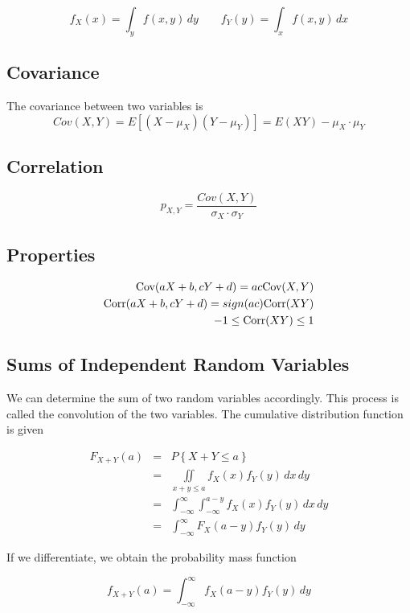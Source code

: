 \[
    f_X(x) = \int_y f(x, y) \, dy \qquad
    f_Y(y) = \int_x f(x, y) \, dx
\]

    \subsection{Covariance}
    The covariance between two variables is
        \[
            Cov(X, Y) = E[(X - \mu_X)(Y - \mu_Y)] = E(XY) - \mu_X \cdot \mu_Y
        \]

    \subsection{Correlation}
        \[
            p_{X, Y} = \frac{Cov(X, Y)}{\sigma_X \cdot \sigma_Y}
        \]

    \subsection{Properties}
    \[
        \begin{aligned}
            \text{Cov}(aX + b, cY + d) = ac\text{Cov}(X, Y)\\
            \text{Corr}(aX + b, cY + d) = sign(ac) \text{Corr}(XY)\\
            -1 \le \text{Corr}(XY) \le 1
        \end{aligned}
    \]

    \subsection{Sums of Independent Random Variables}
    We can determine the sum of two random variables accordingly. This process is called the convolution of the two
    variables. The cumulative distribution function is given

    \[
        \begin{aligned}
            F_{X + Y}(a) &=& P\left\{ X + Y \le a \right\}\\
            &=& \iint\limits_{x + y \le a} f_X(x) f_Y(y) \, dx \, dy\\
            &=& \int_{-\infty}^\infty \int_{-\infty}^{a-y}f_X(x) f_Y(y) \, dx \, dy\\
            &=& \int_{-\infty}^\infty F_X(a - y)f_Y(y) \, dy
        \end{aligned}
    \]

    If we differentiate, we obtain the probability mass function

    \[
        f_{X+Y}(a)= \int_{-\infty}^\infty f_X(a - y)f_Y(y) \, dy
    \]

